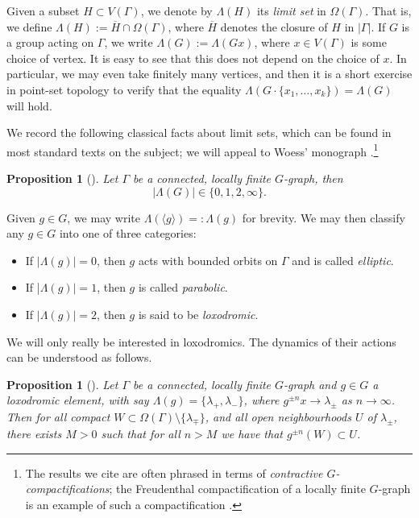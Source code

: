 \documentclass[11pt,a4paper]{amsart}
\newtheorem{proposition}[theorem]{Proposition}
\theoremstyle{definition}
\begin{document}
Given a subset $H \subset V(\Gamma)$, we denote by $\Lambda(H)$ its \emph{limit set} in $\Omega(\Gamma)$. That is, we define
$
\Lambda(H) := \overline H \cap \Omega(\Gamma)
$, 
where $\overline H$ denotes the closure of $H$ in $|\Gamma|$. If $G$ is a group acting on $\Gamma$, we write $\Lambda(G) := \Lambda(Gx)$, where $x \in V(\Gamma)$ is some choice of vertex. It is easy to see that this does not depend on the choice of $x$. In particular, we may even take finitely many vertices, and then it is a short exercise in point-set topology to verify that the equality
$
\Lambda(G \cdot \{x_1, \ldots, x_k\}) = \Lambda(G)
$
will hold.

We record the following classical facts about limit sets, which can be found in most standard texts on the subject; we will appeal to Woess' monograph \cite{woess2000random}.\footnote{The results we cite are often phrased in terms of \emph{contractive $G$-compactifications}; the Freudenthal compactification of a locally finite $G$-graph is an example of such a compactification \cite[Prop.~21.5]{woess2000random}.} 

\begin{proposition}[{\cite[Prop.~20.9(1)]{woess2000random}}]\label{prop:limsets-classification}
    Let $\Gamma$ be a connected, locally finite $G$-graph, then
    $$
    |\Lambda(G)| \in \{0,1,2,\infty\}.
    $$
\end{proposition}

Given $g \in G$, we may write $\Lambda(\langle g \rangle) =: \Lambda(g)$ for brevity. We may then classify any  $g \in G$ into one of three categories:
\begin{itemize}
    \item If $|\Lambda(g)| = 0$, then $g$ acts with bounded orbits on $\Gamma$ and is called \emph{elliptic}. 

    \item If |$\Lambda(g)| = 1$, then $g$ is called \emph{parabolic}. 

    \item If $|\Lambda( g)| = 2$, then $g$ is said to be \emph{loxodromic}.
\end{itemize}

We will only really be interested in loxodromics. The dynamics of their actions can be understood as follows.

\begin{proposition}[{\cite[Prop.~20.7(1)]{woess2000random}}]\label{prop:lox-action}
    Let $\Gamma$ be a connected, locally finite $G$-graph and $g \in G$ a loxodromic element, with say $\Lambda(g) = \{\lambda_+, \lambda_-\}$, where $g^{\pm n}x \to \lambda_{\pm}$ as $n \to \infty$. Then for all compact $W \subset \Omega(\Gamma) \setminus \{\lambda_\mp\}$, and all open neighbourhoods $U$ of $\lambda_\pm$, there exists $M > 0$ such that for all $n > M$ we have that $g^{\pm n}(W) \subset U$. 
\end{proposition}
\end{document}
